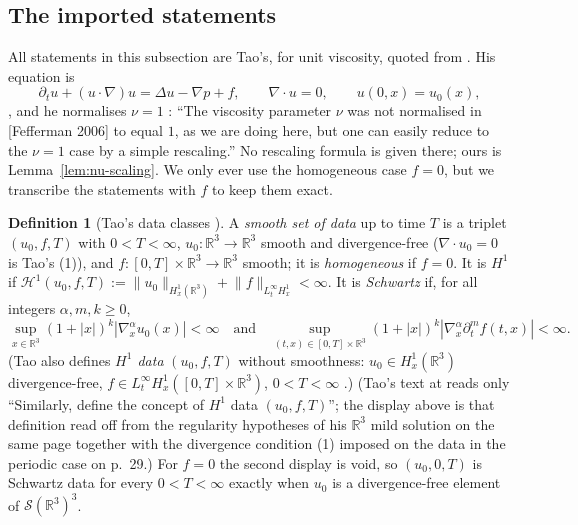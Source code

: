 \documentclass[11pt]{article}
\theoremstyle{definition}
\newtheorem{definition}[theorem]{Definition}
\theoremstyle{plain}
\newcommand{\R}{\mathbb R}
\newcommand{\norm}[1]{\lVert #1\rVert}
\begin{document}
\subsection{The imported statements}\label{subsec:tao}

All statements in this subsection are Tao's, for unit viscosity, quoted
from \cite{Tao2013}.  His equation is
\begin{equation}\label{eq:tao-ns}
 \partial_tu+(u\cdot\nabla)u=\Delta u-\nabla p+f,\qquad\nabla\cdot u=0,
 \qquad u(0,x)=u_0(x),
\end{equation}
\cite[(3)--(5), pp.~26--27]{Tao2013}, and he normalises $\nu=1$
\cite[footnote~3, p.~27]{Tao2013}: ``The viscosity parameter $\nu$ was not
normalised in [Fefferman 2006] to equal $1$, as we are doing here, but one
can easily reduce to the $\nu=1$ case by a simple rescaling.''  No
rescaling formula is given there; ours is Lemma~\ref{lem:nu-scaling}.
We only ever use the homogeneous case $f=0$, but we transcribe the
statements with $f$ to keep them exact.

\begin{definition}[Tao's data classes {\cite[Definition~1.1, p.~26]{Tao2013}}]
\label{def:tao-data}
A \emph{smooth set of data} up to time $T$ is a triplet $(u_0,f,T)$ with
$0<T<\infty$, $u_0:\R^3\to\R^3$ smooth and divergence-free
($\nabla\cdot u_0=0$ is Tao's (1)), and $f:[0,T]\times\R^3\to\R^3$
smooth; it is \emph{homogeneous} if $f=0$.  It is \emph{$H^1$} if
$\mathcal H^1(u_0,f,T):=\norm{u_0}_{H^1_x(\R^3)}
+\norm f_{L^\infty_tH^1_x}<\infty$.  It is \emph{Schwartz} if, for all
integers $\alpha,m,k\geq0$,
\[
 \sup_{x\in\R^3}(1+|x|)^k|\nabla_x^\alpha u_0(x)|<\infty
 \quad\text{and}\quad
 \sup_{(t,x)\in[0,T]\times\R^3}(1+|x|)^k|\nabla_x^\alpha\partial_t^mf(t,x)|
 <\infty .
\]
(Tao also defines \emph{$H^1$ data} $(u_0,f,T)$ without smoothness: $u_0\in
H^1_x(\R^3)$ divergence-free, $f\in L^\infty_tH^1_x([0,T]\times\R^3)$,
$0<T<\infty$ \cite[p.~31]{Tao2013}.)  (Tao's text at
\cite[p.~31]{Tao2013} reads only ``Similarly, define the
concept of $H^1$ data $(u_0,f,T)$''; the display above is that definition
read off from the regularity hypotheses of his $\R^3$ mild solution on the
same page together with the divergence condition (1) imposed on the data in
the periodic case on p.~29.)  For $f=0$ the second display is
void, so $(u_0,0,T)$ is Schwartz data for every $0<T<\infty$ exactly when
$u_0$ is a divergence-free element of $\mathcal S(\R^3)^3$.
\end{definition}
\end{document}
